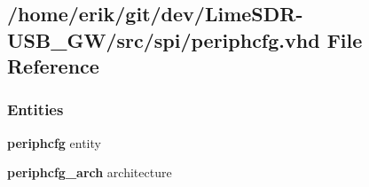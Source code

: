 \subsection{/home/erik/git/dev/\+Lime\+S\+D\+R-\/\+U\+S\+B\+\_\+\+G\+W/src/spi/periphcfg.vhd File Reference}
\label{periphcfg_8vhd}
\subsubsection*{Entities}
\begin{DoxyCompactItemize}
\item 
{\bf periphcfg} entity
\item 
{\bf periphcfg\+\_\+arch} architecture
\end{DoxyCompactItemize}
